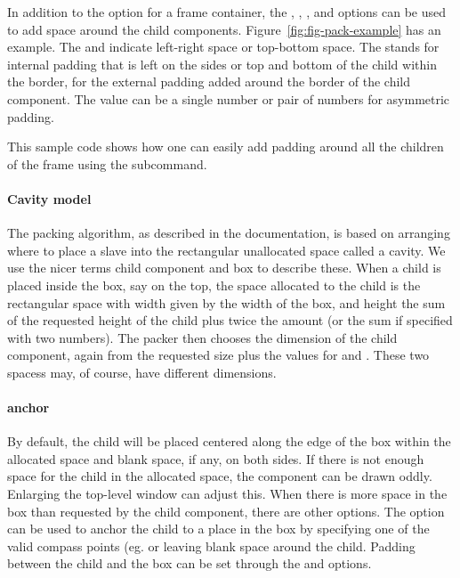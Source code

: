 In addition to the  option for a frame container, the
, , ,
and  options can be used to add space around the
child components. Figure~\ref{fig:fig-pack-example} has an
example. The  and  indicate left-right space or
top-bottom space. The  stands for internal padding that is
left on the sides or top and bottom of the child within the border,
for  the external padding added around the border of the
child component. The value can be a single number or pair of numbers
for asymmetric padding.


This sample code shows how one can easily add padding around all the
children of the frame  using the
 subcommand.


\paragraph{Cavity model}
The packing algorithm, as described in the \Tk\/ documentation, is based
on arranging where to place a slave into the rectangular unallocated
space called a cavity. We use the nicer terms child component and box
to describe these. When a child is placed inside the box, say on the
top, the space allocated to the child is the rectangular space with
width given by the width of the box, and height the sum of the
requested height of the child plus twice the  amount (or
the sum if specified with two numbers). The packer then chooses the
dimension of the child component, again from the requested size plus
the  values for  and . These two spacess
may, of course, have different dimensions.


\paragraph{anchor}
By default, the child  will be placed centered along the edge of
the box within the allocated space and blank space, if any, on both
sides.  If there is not enough space for the child in the allocated
space, the component can be drawn oddly. Enlarging the top-level
window can adjust this. When there is more space in the box than
requested by the child component, there are other options. The
 option can be used to anchor the child to a
place in the box by specifying one of the valid compass points
(eg.  or  leaving blank space around the
child. Padding between the child and the box can be set through the
 and  options.

